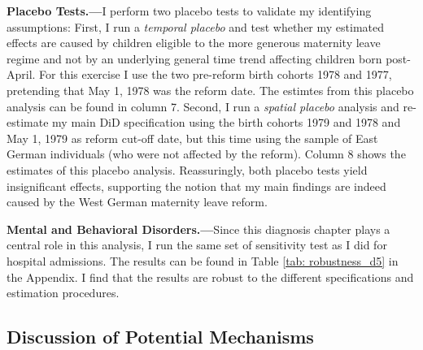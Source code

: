 \documentclass[11pt, a4paper]{article} %
\begin{document}
\textbf{Placebo Tests.---}I perform two placebo tests to validate my identifying assumptions: First, I run a \textit{temporal placebo} and test whether my estimated effects are caused by children eligible to the more generous maternity leave regime and not by an underlying general time trend affecting children born post-April. For this exercise I use the two pre-reform birth cohorts 1978 and 1977, pretending that May 1, 1978 was the reform date. The estimtes from this placebo analysis can be found in column 7. Second, I run a \textit{spatial placebo} analysis and re-estimate my main DiD specification using the birth cohorts 1979 and 1978 and May 1, 1979 as reform cut-off date, but this time using the sample of East German individuals (who were not affected by the reform). Column 8 shows the estimates of this placebo analysis. Reassuringly, both placebo tests yield insignificant effects, supporting the notion that my main findings are indeed caused by the West German maternity leave reform.\newline


\textbf{Mental and Behavioral Disorders.---}Since this diagnosis chapter plays a central role in this analysis, I run the same set of sensitivity test as I did for hospital admissions. The results can be found in Table \ref{tab: robustness_d5} in the Appendix. I find that the results are robust to the different specifications and estimation procedures.\newline



\subsection[Discussion]{Discussion of Potential Mechanisms}
\end{document}
